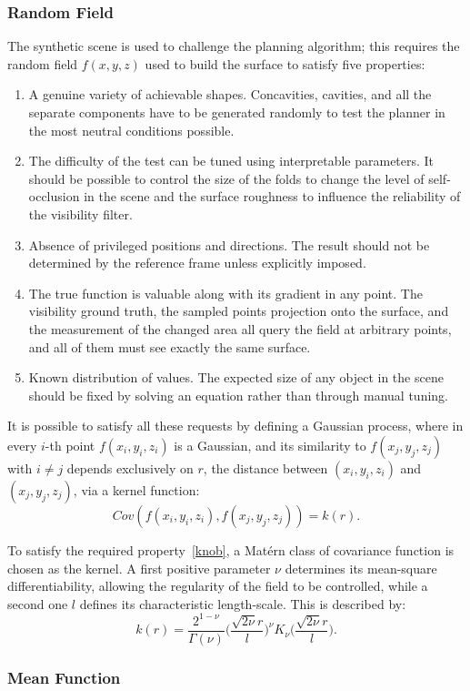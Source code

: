 \subsubsection{Random Field}
The synthetic scene is used to challenge the planning algorithm; this requires the random field $f(x,y,z)$ used to build the surface to satisfy five properties:
\begin{enumerate}
  \item A genuine variety of achievable shapes. Concavities, cavities, and all the separate components have to be generated randomly to test the planner in the most neutral conditions possible.
  \item \label{knob}The difficulty of the test can be tuned using interpretable parameters. It should be possible to control the size of the folds to change the level of self-occlusion in the scene and the surface roughness to influence the reliability of the visibility filter.
  \item Absence of privileged positions and directions. The result should not be determined by the reference frame unless explicitly imposed.
  \item The true function is valuable along with its gradient in any point. The visibility ground truth, the sampled points projection onto the surface, and the measurement of the changed area all query the field at arbitrary points, and all of them must see exactly the same surface.
  \item Known distribution of values. The expected size of any object in the scene should be fixed by solving an equation rather than through manual tuning.
\end{enumerate}

It is possible to satisfy all these requests by defining a Gaussian process, where in every $i$-th point $f(x_i, y_i, z_i)$ is a Gaussian, and its similarity to $f(x_j, y_j, z_j)$ with $i \neq j$ depends exclusively on $r$, the distance between $(x_i, y_i, z_i)$ and $(x_j, y_j, z_j)$, via a kernel function:
\begin{equation}
    Cov(f(x_i, y_i, z_i), f(x_j, y_j, z_j))=k(r).
\end{equation}

To satisfy the required property~\ref{knob}, a Matérn class of covariance function is chosen as the kernel. A first positive parameter $\nu$ determines its mean-square differentiability, allowing the regularity of the field to be controlled, while a second one $l$ defines its characteristic length-scale. This is described by:
\begin{equation}
    k(r)=\frac{2^{1-\nu}}{\Gamma(\nu)}\big(\frac{\sqrt{2\nu}r}{l}\big)^\nu K_\nu \big(\frac{\sqrt{2\nu}r}{l}\big).
\end{equation}

\subsubsection{Mean Function}